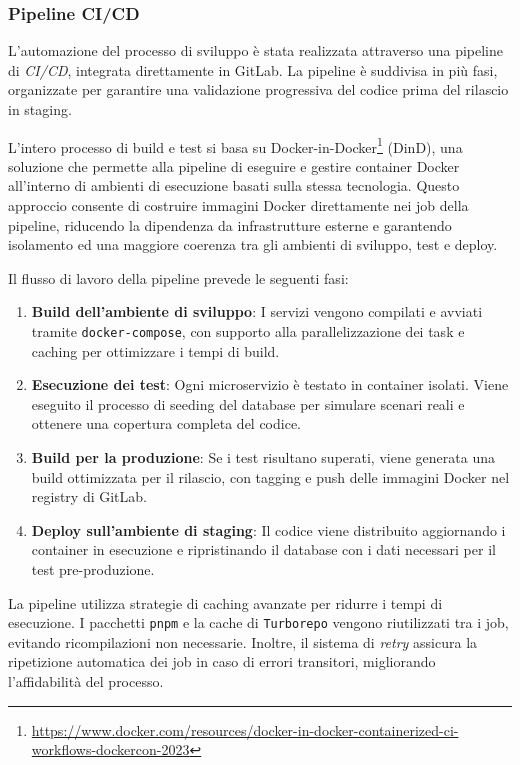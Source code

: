 \subsubsection{Pipeline CI/CD}
L'automazione del processo di sviluppo è stata realizzata attraverso una pipeline di \textit{CI/CD}, integrata direttamente in GitLab. La pipeline è suddivisa in più fasi, organizzate per garantire una validazione progressiva del codice prima del rilascio in staging.

L'intero processo di build e test si basa su Docker-in-Docker\footnote{\url{https://www.docker.com/resources/docker-in-docker-containerized-ci-workflows-dockercon-2023}} (DinD), una soluzione che permette alla pipeline di eseguire e gestire container Docker all'interno di ambienti di esecuzione basati sulla stessa tecnologia. Questo approccio consente di costruire immagini Docker direttamente nei job della pipeline, riducendo la dipendenza da infrastrutture esterne e garantendo isolamento ed una maggiore coerenza tra gli ambienti di sviluppo, test e deploy.

Il flusso di lavoro della pipeline prevede le seguenti fasi:
\begin{enumerate}
  \item \textbf{Build dell'ambiente di sviluppo}: I servizi vengono compilati e avviati tramite \texttt{docker-compose}, con supporto alla parallelizzazione dei task e caching per ottimizzare i tempi di build.
  \item \textbf{Esecuzione dei test}: Ogni microservizio è testato in container isolati. Viene eseguito il processo di seeding del database per simulare scenari reali e ottenere una copertura completa del codice.
  \item \textbf{Build per la produzione}: Se i test risultano superati, viene generata una build ottimizzata per il rilascio, con tagging e push delle immagini Docker nel registry di GitLab.
  \item \textbf{Deploy sull'ambiente di staging}: Il codice viene distribuito aggiornando i container in esecuzione e ripristinando il database con i dati necessari per il test pre-produzione.
\end{enumerate}

La pipeline utilizza strategie di caching avanzate per ridurre i tempi di esecuzione. I pacchetti \texttt{pnpm} e la cache di \texttt{Turborepo} vengono riutilizzati tra i job, evitando ricompilazioni non necessarie. Inoltre, il sistema di \textit{retry} assicura la ripetizione automatica dei job in caso di errori transitori, migliorando l'affidabilità del processo.

